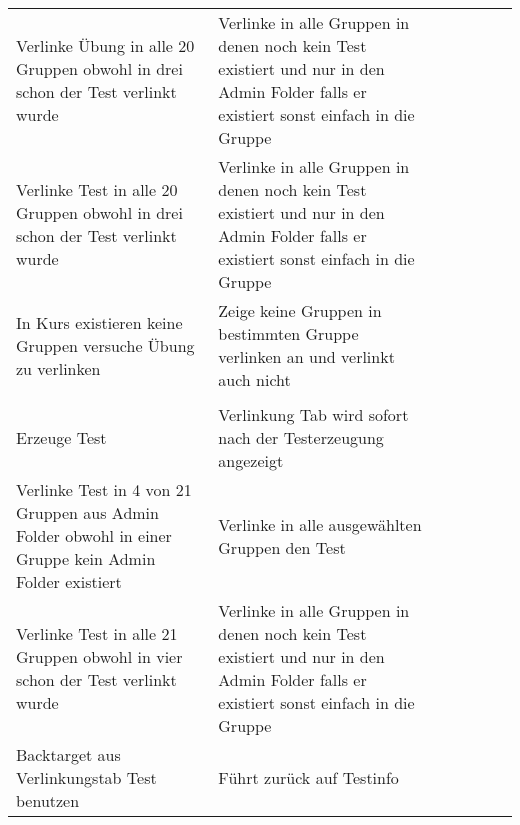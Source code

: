 \begin{table}[]
\begin{tabular}{p{6cm}p{7cm}p{3cm}llll}
		Verlinke Übung in alle 20 Gruppen obwohl in drei schon der Test verlinkt wurde                                                       & Verlinke in alle Gruppen in denen noch kein Test existiert und nur in den Admin Folder falls er existiert sonst einfach in die Gruppe                            & \checkmark           &  &  &  \\Verlinke Test in alle 20 Gruppen obwohl in drei schon der Test verlinkt wurde                                                        & Verlinke in alle Gruppen in denen noch kein Test existiert und nur in den Admin Folder falls er existiert sonst einfach in die Gruppe                            & \checkmark           &  &  &  \\
		In Kurs existieren keine Gruppen versuche Übung zu verlinken                                                                         & Zeige keine Gruppen in bestimmten Gruppe verlinken an und verlinkt auch nicht                                                                                    & \checkmark           &  &  &  \\
		&                                                                                                                                                                  &             &  &  &  \\
		Erzeuge Test                                                                                                                         & Verlinkung Tab wird sofort nach der Testerzeugung angezeigt                                                                                                      & \checkmark           &  &  &  \\
		Verlinke Test in 4 von 21 Gruppen aus Admin Folder obwohl in einer Gruppe kein Admin Folder existiert                               & Verlinke in alle ausgewählten Gruppen den Test                                                                                                                   & \checkmark           &  &  &  \\
		Verlinke Test in alle 21 Gruppen obwohl in vier schon der Test verlinkt wurde                                                        & Verlinke in alle Gruppen in denen noch kein Test existiert und nur in den Admin Folder falls er existiert sonst einfach in die Gruppe                            & \checkmark           &  &  &  \\
		Backtarget aus Verlinkungstab Test benutzen                                                                                          & Führt zurück auf Testinfo                                                                                                                                        & \checkmark           &  &  &  \\

\end{tabular}
\end{table}
